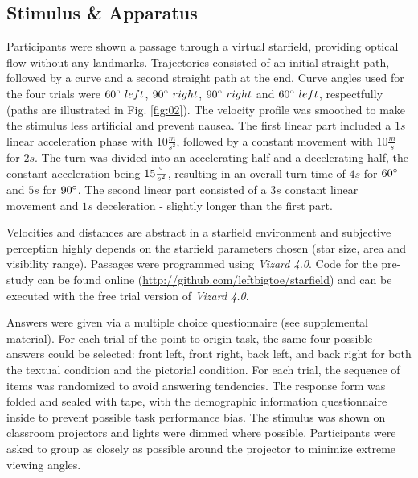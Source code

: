 \documentclass{frontiersSCNS} %
\begin{document}
\subsection{Stimulus \& Apparatus}
Participants were shown a passage through a virtual starfield, providing optical flow without any landmarks. Trajectories consisted of an initial straight path, followed by a curve and a second straight path at the end. Curve angles used for the four trials were $60 \degree \ left$, $90 \degree \ right$, $90 \degree \ right$ and $60\degree \ left$, respectfully (paths are illustrated in Fig. \ref{fig:02}). The velocity profile was smoothed to make the stimulus less artificial and prevent nausea. The first linear part included a $1s$ linear acceleration phase with $10 \frac{m}{s^2}$, followed by a constant movement with $10 \frac{m}{s}$ for $2s$. The turn was divided into an accelerating half and a decelerating half, the constant acceleration being $15 \frac{\degree}{s^2}$, resulting in an overall turn time of $4s$ for $60 \degree$ and $5s$ for $90 \degree$. The second linear part consisted of a $3s$ constant linear movement and $1s$ deceleration -  slightly longer than the first part. 

Velocities and distances are abstract in a starfield environment and subjective perception highly depends on the starfield parameters chosen (star size, area and visibility range). Passages were programmed using \textit{Vizard 4.0}. Code for the pre-study can be found online (\url{http://github.com/leftbigtoe/starfield}) and can be executed with the free trial version of \textit{Vizard 4.0}.


Answers were given via a multiple choice questionnaire (see supplemental material). For each trial of the point-to-origin task, the same four possible answers could be selected: front left, front right, back left, and back right for both the textual condition and the pictorial condition. For each trial, the sequence of items was randomized to avoid answering tendencies. The response form was folded and sealed with tape, with the demographic information questionnaire inside to prevent possible task performance bias. 
The stimulus was shown on classroom projectors and lights were dimmed where possible. Participants were asked to group as closely as possible around the projector to minimize extreme viewing angles.
\end{document}
